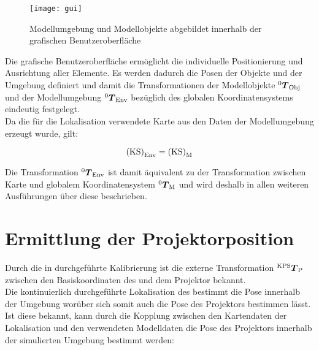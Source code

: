 \begin{figure}[!ht]
	\begin{center}
		\texttt{[image: gui]}
		\caption{Modellumgebung und Modellobjekte abgebildet innerhalb der grafischen Benutzeroberfläche}
		\label{fig.modscene}
	\end{center}
\end{figure}


Die grafische Benutzeroberfläche ermöglicht die individuelle Positionierung und Ausrichtung aller Elemente. Es werden dadurch die Posen der Objekte und der Umgebung definiert und damit die Transformationen der Modellobjekte ${^{\mathrm{0}}\mbox{\boldmath{$T$}}_{\mathrm{Obj}}}$ und der Modellumgebung ${^{\mathrm{0}}\mbox{\boldmath{$T$}}_{\mathrm{Env}}}$ bezüglich des globalen Koordinatensystems eindeutig festgelegt.\\
Da die für die Lokalisation verwendete Karte aus den Daten der Modellumgebung erzeugt wurde, gilt:

\begin{equation}
{\mathrm{(KS)}}_{\mathrm{Env}} = {\mathrm{(KS)}}_{\mathrm{M}}
\end{equation}

Die Transformation ${^{\mathrm{0}}\mbox{\boldmath{$T$}}_{\mathrm{Env}}}$ ist damit äquivalent zu der Transformation zwischen Karte und globalem Koordinatensystem ${^{\mathrm{0}}\mbox{\boldmath{$T$}}_{\mathrm{M}}}$ und wird deshalb in allen weiteren Ausführungen über diese beschrieben.\\

\section{Ermittlung der Projektorposition}
Durch die in  durchgeführte Kalibrierung ist die externe Transformation ${^{\mathrm{KPS}}\mbox{\boldmath{$T$}}_{\mathrm{P}}}$ zwischen den Basiskoordinaten des  und dem Projektor bekannt.\\
Die kontinuierlich durchgeführte Lokalisation des  bestimmt die Pose innerhalb der Umgebung worüber sich somit auch die Pose des Projektors bestimmen lässt. Ist diese bekannt, kann durch die Kopplung zwischen den Kartendaten der Lokalisation und den verwendeten Modelldaten die Pose des Projektors innerhalb der simulierten Umgebung bestimmt werden:

